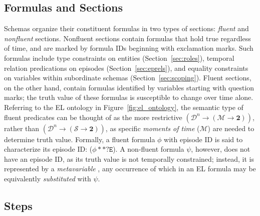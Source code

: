 \subsection{Formulas and Sections}
Schemas organize their constituent formulas in two types of sections: \textit{fluent} and \textit{nonfluent} sections. Nonfluent sections contain formulas that hold true regardless of time, and are marked by formula IDs beginning with exclamation marks. Such formulas include type constraints on entities (Section~\ref{sec:roles}), temporal relation predications on episodes (Section~\ref{sec:eprels}), and equality constraints on variables within subordinate schemas (Section~\ref{sec:scoping}). Fluent sections, on the other hand, contain formulas identified by variables starting with question marks; the truth value of these formulas is susceptible to change over time alone. Referring to the EL ontology in Figure~\ref{fig:el_ontology}, the semantic type of fluent predicates can be thought of as the more restrictive $(\mathcal{D}^{n} \rightarrow (\mathcal{M} \rightarrow \textbf{2}))$, rather than $(\mathcal{D}^{n} \rightarrow (\mathcal{S} \rightarrow \textbf{2}))$, as specific \textit{moments of time} ($\mathcal{M}$) are needed to determine truth value. Formally, a fluent formula $\phi$ with episode ID  is said to characterize its episode ID: ($\phi ** \texttt{?E}$). A non-fluent formula $\psi$, however, does not have an episode ID, as its truth value is not temporally constrained; instead, it is represented by a \textit{metavariable} , any occurrence of which in an EL formula may be equivalently \textit{substituted} with $\psi$.

\subsection{Steps}
\label{sec:steps}

